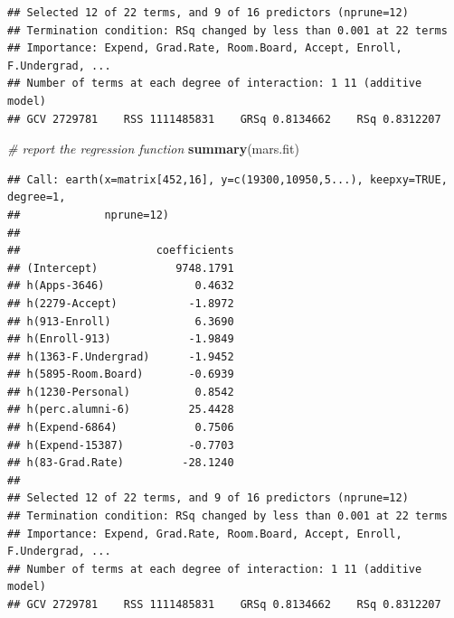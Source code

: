 \documentclass[
]{article}
\newenvironment{Shaded}{\begin{snugshade}}{\end{snugshade}}
\newcommand{\CommentTok}[1]{\textcolor[rgb]{0.56,0.35,0.01}{\textit{#1}}}
\newcommand{\FunctionTok}[1]{\textcolor[rgb]{0.13,0.29,0.53}{\textbf{#1}}}
\newcommand{\NormalTok}[1]{#1}
\newcommand{\SpecialCharTok}[1]{\textcolor[rgb]{0.81,0.36,0.00}{\textbf{#1}}}
\begin{document}
\begin{Shaded}
\end{Shaded}

\begin{verbatim}
## Selected 12 of 22 terms, and 9 of 16 predictors (nprune=12)
## Termination condition: RSq changed by less than 0.001 at 22 terms
## Importance: Expend, Grad.Rate, Room.Board, Accept, Enroll, F.Undergrad, ...
## Number of terms at each degree of interaction: 1 11 (additive model)
## GCV 2729781    RSS 1111485831    GRSq 0.8134662    RSq 0.8312207
\end{verbatim}

\begin{Shaded}
\begin{Highlighting}[]
\CommentTok{\# report the regression function}
\FunctionTok{summary}\NormalTok{(mars.fit)}
\end{Highlighting}
\end{Shaded}

\begin{verbatim}
## Call: earth(x=matrix[452,16], y=c(19300,10950,5...), keepxy=TRUE, degree=1,
##             nprune=12)
## 
##                     coefficients
## (Intercept)            9748.1791
## h(Apps-3646)              0.4632
## h(2279-Accept)           -1.8972
## h(913-Enroll)             6.3690
## h(Enroll-913)            -1.9849
## h(1363-F.Undergrad)      -1.9452
## h(5895-Room.Board)       -0.6939
## h(1230-Personal)          0.8542
## h(perc.alumni-6)         25.4428
## h(Expend-6864)            0.7506
## h(Expend-15387)          -0.7703
## h(83-Grad.Rate)         -28.1240
## 
## Selected 12 of 22 terms, and 9 of 16 predictors (nprune=12)
## Termination condition: RSq changed by less than 0.001 at 22 terms
## Importance: Expend, Grad.Rate, Room.Board, Accept, Enroll, F.Undergrad, ...
## Number of terms at each degree of interaction: 1 11 (additive model)
## GCV 2729781    RSS 1111485831    GRSq 0.8134662    RSq 0.8312207
\end{verbatim}

\begin{Shaded}
\end{Shaded}
\end{document}
